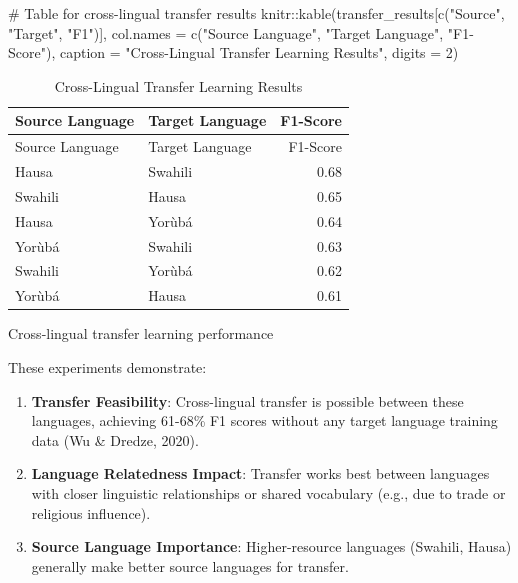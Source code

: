 \documentclass[
]{article}
\newenvironment{Shaded}{\begin{snugshade}}{\end{snugshade}}
\newcommand{\AttributeTok}[1]{\textcolor[rgb]{0.40,0.45,0.13}{#1}}
\newcommand{\CommentTok}[1]{\textcolor[rgb]{0.37,0.37,0.37}{#1}}
\newcommand{\DecValTok}[1]{\textcolor[rgb]{0.68,0.00,0.00}{#1}}
\newcommand{\FunctionTok}[1]{\textcolor[rgb]{0.28,0.35,0.67}{#1}}
\newcommand{\NormalTok}[1]{\textcolor[rgb]{0.00,0.23,0.31}{#1}}
\newcommand{\SpecialCharTok}[1]{\textcolor[rgb]{0.37,0.37,0.37}{#1}}
\newcommand{\StringTok}[1]{\textcolor[rgb]{0.13,0.47,0.30}{#1}}
\begin{document}
\begin{Shaded}
\begin{Highlighting}[]
\CommentTok{\# Table for cross{-}lingual transfer results}
\NormalTok{knitr}\SpecialCharTok{::}\FunctionTok{kable}\NormalTok{(transfer\_results[}\FunctionTok{c}\NormalTok{(}\StringTok{"Source"}\NormalTok{, }\StringTok{"Target"}\NormalTok{, }\StringTok{"F1"}\NormalTok{)], }
             \AttributeTok{col.names =} \FunctionTok{c}\NormalTok{(}\StringTok{"Source Language"}\NormalTok{, }\StringTok{"Target Language"}\NormalTok{, }\StringTok{"F1{-}Score"}\NormalTok{),}
             \AttributeTok{caption =} \StringTok{"Cross{-}Lingual Transfer Learning Results"}\NormalTok{,}
             \AttributeTok{digits =} \DecValTok{2}\NormalTok{)}
\end{Highlighting}
\end{Shaded}

\begin{longtable}[]{@{}llr@{}}
\caption{Cross-Lingual Transfer Learning Results}\tabularnewline
\toprule\noalign{}
Source Language & Target Language & F1-Score \\
\midrule\noalign{}
\endfirsthead
\toprule\noalign{}
Source Language & Target Language & F1-Score \\
\midrule\noalign{}
\endhead
\bottomrule\noalign{}
\endlastfoot
Hausa & Swahili & 0.68 \\
Swahili & Hausa & 0.65 \\
Hausa & Yorùbá & 0.64 \\
Yorùbá & Swahili & 0.63 \\
Swahili & Yorùbá & 0.62 \\
Yorùbá & Hausa & 0.61 \\
\end{longtable}

Cross-lingual transfer learning performance

These experiments demonstrate:

\begin{enumerate}
\def\labelenumi{\arabic{enumi}.}
\item
  \textbf{Transfer Feasibility}: Cross-lingual transfer is possible
  between these languages, achieving 61-68\% F1 scores without any
  target language training data (Wu \& Dredze, 2020).
\item
  \textbf{Language Relatedness Impact}: Transfer works best between
  languages with closer linguistic relationships or shared vocabulary
  (e.g., due to trade or religious influence).
\item
  \textbf{Source Language Importance}: Higher-resource languages
  (Swahili, Hausa) generally make better source languages for transfer.
\end{enumerate}
\end{document}
